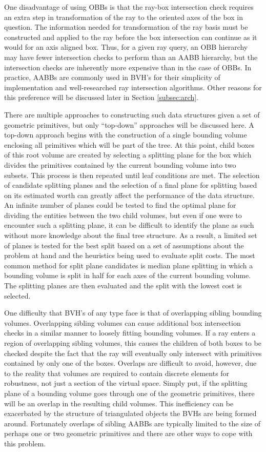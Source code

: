 One disadvantage of using OBBs is that the ray-box intersection check requires
an extra step in transformation of the ray to the oriented axes of the box in
question. The information needed for transformation of the ray basis must
be constructed and applied to the ray before the box intersection can continue
as it would for an axis aligned box. Thus, for a given ray query, an OBB hierarchy may
have fewer intersection checks to perform than an AABB hierarchy, but the
intersection checks are inherently more expensive than in the case of OBBs. In
practice, AABBs are commonly used in BVH's for their simplicity of
implementation and well-researched ray intersection algorithms. Other reasons
for this preference will be discussed later in Section \ref{subsec:arch}.

There are multiple approaches to constructing such data structures given a set
of geometric primitives, but only ``top-down'' approaches will be discussed
here. A top-down approach begins with the construction of a single bounding
volume enclosing all primitives which will be part of the tree. At this point,
child boxes of this root volume are created by selecting a splitting plane for
the box which divides the primitives contained by the current bounding volume
into two subsets. This process is then repeated until leaf conditions are
met. The selection of candidate splitting planes and the selection of a final
plane for splitting based on its estimated worth can greatly affect the
performance of the data structure. An infinite number of planes could be
tested to find the optimal plane for dividing the entities between the two child
volumes, but even if one were to encounter such a splitting plane, it can be
difficult to identify the plane as such without more knowledge about the final
tree structure. As a result, a limited set of planes is tested for the best
split based on a set of assumptions about the problem at hand and the heuristics
being used to evaluate split costs. The most common method for split plane
candidates is median plane splitting in which a bounding volume is split in half
for each axes of the current bounding volume. The splitting planes are then
evaluated and the split with the lowest cost is selected.

One difficulty that BVH's of any type face is that of overlapping sibling
bounding volumes. Overlapping sibling volumes can cause additional box
intersection checks in a similar manner to loosely fitting bounding volumes. If
a ray enters a region of overlapping sibling volumes, this causes the children
of both boxes to be checked despite the fact that the ray will eventually only
intersect with primitives contained by only one of the boxes. Overlaps are difficult to
avoid, however, due to the reality that volumes are required to contain discrete
elements for robustness, not just a section of the virtual space. Simply put, if
the splitting plane of a bounding volume goes through one of the geometric
primitives, there will be an overlap in the resulting child volumes. This
inefficiency can be exacerbated by the structure of triangulated objects the
BVHs are being formed around. Fortunately overlaps of sibling AABBs are
typically limited to the size of perhaps one or two geometric primitives and
there are other ways to cope with this problem.

